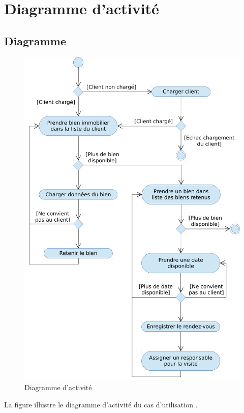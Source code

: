 \chapter{Diagramme d'activité}

\section{Diagramme}

\begin{figure}
  \centering
  \includegraphics[scale=0.67]{IMG/ad}
  \caption{Diagramme d'activité}
  \label{img_ad}
\end{figure}

La figure  illustre le diagramme d'activité du cas d'utilisation \selectedusecase{}.

